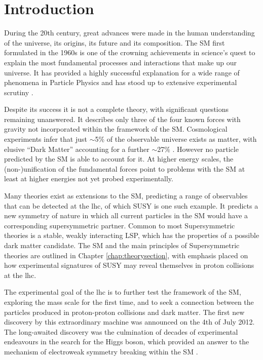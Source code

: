 \chapter{Introduction}
\label{chap:introduction}

During the 20th century, great advances were made in the human understanding of the universe, its origins, its future and its composition. The \acf{SM} first formulated in the 1960s is one of the crowning achievements in science's quest to explain the most fundamental processes and interactions that make up our universe. It has provided a highly successful explanation for a wide range of phenomena in Particle Physics and has stood up to extensive experimental scrutiny \cite{pdg2012}.

Despite its success it is not  a complete theory, with significant questions remaining unanswered. It describes only three of the four known forces with gravity not incorporated within the framework of the \ac{SM}. Cosmological experiments infer that just $\sim$5$\%$ of the observable universe exists as matter, with elusive ``Dark Matter'' accounting for a further $\sim$27$\%$ \cite{Ade:2013zuv}. However no particle predicted by the \ac{SM} is able to account for it.  At higher energy scales, the (non-)unification of the fundamental forces point to problems with the \ac{SM} at least at higher energies not yet probed experimentally. 

Many theories exist as extensions to the \ac{SM}, predicting a range of observables that can be detected at the \acf{lhc}, of which \acf{SUSY} is one such example. It predicts a new symmetry of nature in which all current particles in the \ac{SM} would have a corresponding supersymmetric partner. Common to most Supersymmetric theories is a stable, weakly interacting \acf{LSP}, which has the properties of a possible dark matter candidate. The \ac{SM} and the main principles of Supersymmetric theories are outlined in Chapter \ref{chap:theorysection}, with emphasis placed on how experimental signatures of \ac{SUSY} may reveal themselves in proton collisions at the \ac{lhc}.

The experimental goal of the \ac{lhc} is to further test the framework of the \ac{SM}, exploring the \TeV mass scale for the first time, and to seek a connection between the particles produced in proton-proton collisions and dark matter. The first new discovery by this extraordinary machine was announced on the 4th of July 2012. The long-awaited discovery was the culmination of decades of experimental endeavours in the search for the Higgs boson, which provided an answer to the mechanism of electroweak symmetry breaking within the \ac{SM} \cite{Aad:2012tfa}\cite{Chatrchyan:2012ufa}. 


